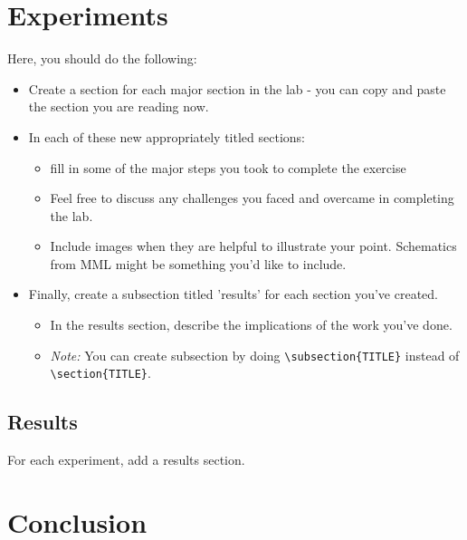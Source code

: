 \documentclass{article}
\begin{document}
\section{Experiments}
Here, you should do the following:
\begin{itemize}
     \item Create a section for each major section in the lab - you can copy and paste the section you are reading now.
     \item In each of these new appropriately titled sections:
     \begin{itemize}
     	\item fill in some of the major steps you took to complete the exercise 
     	\item Feel free to discuss any challenges you faced and overcame in completing the lab.
        \item Include images when they are helpful to illustrate your point. Schematics from MML might be something you'd like to include. 
     \end{itemize}
    
    \item Finally, create a subsection titled 'results' for each section you've created.
	\begin{itemize}
    	\item In the results section, describe the implications of the work you've done.
        \item \emph{Note:} You can create subsection by doing \verb|\subsection{TITLE}| instead of \verb|\section{TITLE}|.
	\end{itemize}
\end{itemize}

\subsection{Results}
For each experiment, add a results section.



\section{Conclusion}
\end{document}
